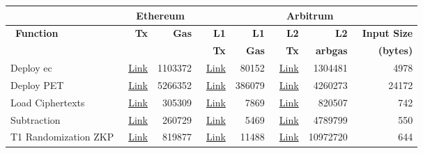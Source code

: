 \begin{table}[]
		\centering
	\begin{tabular}{|l|r|r|r|r|r|r|r|}
		\hline
		&    \multicolumn{2}{c|}{~\textbf{Ethereum}} & \multicolumn{5}{c|}{~\textbf{Arbitrum}} \\ \hline
	   ~\textbf{Function}  &~\textbf{Tx} &~\textbf{Gas}   & ~\textbf{ L1} & ~\textbf{L1}  & ~\textbf{L2} &~\textbf{L2}& ~\textbf{Input Size} \\ 
	     & &  &~\textbf{Tx} &  ~\textbf{Gas} & ~\textbf{Tx}&~\textbf{arbgas}& ~\textbf{(bytes)} \\ 
		\hline
	    Deploy ec &  ~\href{https://kovan.etherscan.io/tx/0x088af056a640c1fe2188678e52484f89b7ba0bd9345bb0578d91c96aa480c59c}{Link}& 1103372& ~\href{https://kovan.etherscan.io/tx/0xa80f0eb0408f8f1c760abbc223b6a3b24780aba4b85f96ecbd6fb0dfe94bd606}{Link}&80152& ~\href{https://explorer.offchainlabs.com/#/tx/0x7c82717b52cb133c8855c0833d3cbf9ded19f884764fce78de3bb4e27feb63cd}{Link}&1304481&4978\\  \cline{1-8}
	  
	    Deploy PET &  ~\href{https://kovan.etherscan.io/tx/0xb76cda2c91907234afc0b971df893a6dbcdf83d482d2ff3d7d29b4a0b313002f}{Link}&5266352& ~\href{https://kovan.etherscan.io/tx/0x2ec73b92474c991d7b9f8ad1c46f95ef9125513897badb0c0c5faa19bd5b9a55}{Link}&386079& ~\href{https://explorer.offchainlabs.com/#/tx/0x2b1e63c81ca8ab7f4a6fe5333daab515a4e7408121771ae58e205ee037bceb50}{Link}&4260273&24172\\  \cline{1-8}
	
		Load Ciphertexts  & ~\href{https://kovan.etherscan.io/tx/0x2cb4bf0f6ce9fc7cabf0c152fdc61ccfff00a0f2e717c85da7eab806fa101b5b}{Link}&305309 &  \href{https://kovan.etherscan.io/tx/0x612e19481fff4ddd1c2dfe260908f15c7c74072a1e733597b4bab1c1209169f4}{Link}& 7869 &\href{https://explorer.offchainlabs.com/#/tx/0x28b3fa1a91d6d6e13005d352940861a026ac029fbc13a58dc969e98ffb5b392c}{Link} &  820507& 742\\  \cline{1-8}
	
		Subtraction & ~\href{https://kovan.etherscan.io/tx/0x6eeb3031c81af252df1fb806ae0a57643c20792df7336004465c6a74792c0016}{Link}&260729 & ~\href{https://kovan.etherscan.io/tx/0xa31a5653f3bfbdf7bcce4520c2a4f0e8d38fbc5c19036548199f805a4997cf68}{Link} & 5469& ~\href{https://explorer.offchainlabs.com/#/tx/0xbeff60af08f1b88deabe690322e26794d87595b332f1f1d01095a6a4528c4254}{Link} & 4789799& 550\\  \cline{1-8}
	
		T1 Randomization ZKP &~\href{https://kovan.etherscan.io/tx/0x30e8ccff5af6f3489ba2dc11e3198f0216487f380aa2a66ddf97e94650490e88}{Link} &819877 &  ~\href{https://kovan.etherscan.io/tx/0xc08cc82908b7e87e8ddc75695c4f29c3bce3d9a8caced144f003c59e23f4690e}{Link}&  11488&  ~\href{https://explorer.offchainlabs.com/#/tx/0xe3d1ba8bc653397dd67f3bfb602db0acce617668dc2ae2f30e038b4137a60e24}{Link}& 10972720& 644\\  \cline{1-8}
	

\end{tabular}
\end{table}
